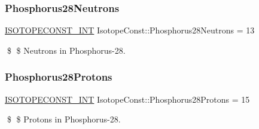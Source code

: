 \subsubsection{\texorpdfstring{Phosphorus28\+Neutrons}{Phosphorus28Neutrons}}
{\footnotesize\ttfamily \mbox{\hyperlink{group___isotope_const-_macros_ga5f18360b3e99483a35c32d789e62621c}{I\+S\+O\+T\+O\+P\+E\+C\+O\+N\+S\+T\+\_\+\+I\+NT}} Isotope\+Const\+::\+Phosphorus28\+Neutrons = 13}

\$ \$ Neutrons in Phosphorus-\/28. \mbox{\label{group___isotope_const-_phosphorus-_p28_ga49d8d18ff48b7765889ed86df8ddcf7b}} 
\subsubsection{\texorpdfstring{Phosphorus28\+Protons}{Phosphorus28Protons}}
{\footnotesize\ttfamily \mbox{\hyperlink{group___isotope_const-_macros_ga5f18360b3e99483a35c32d789e62621c}{I\+S\+O\+T\+O\+P\+E\+C\+O\+N\+S\+T\+\_\+\+I\+NT}} Isotope\+Const\+::\+Phosphorus28\+Protons = 15}

\$ \$ Protons in Phosphorus-\/28. 